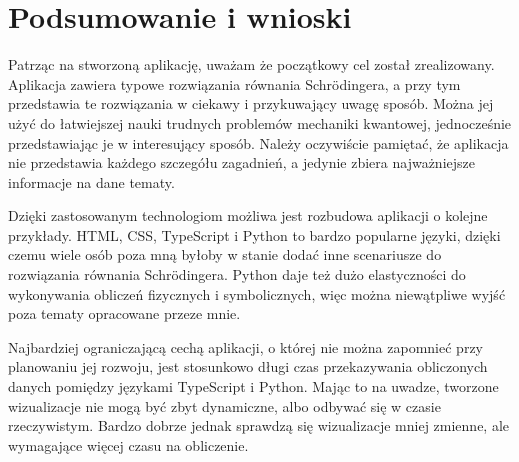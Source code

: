 \documentclass{SGGW-thesis}
\begin{document}
\chapter{Podsumowanie i wnioski}
	Patrząc na stworzoną aplikację, uważam że początkowy cel został zrealizowany. Aplikacja zawiera typowe rozwiązania równania Schrödingera, a przy tym przedstawia te rozwiązania w ciekawy i przykuwający uwagę sposób. Można jej użyć do łatwiejszej nauki trudnych problemów mechaniki kwantowej, jednocześnie przedstawiając je w interesujący sposób. Należy oczywiście pamiętać, że aplikacja nie przedstawia każdego szczegółu zagadnień, a jedynie zbiera najważniejsze informacje na dane tematy.
	
	Dzięki zastosowanym technologiom możliwa jest rozbudowa aplikacji o kolejne przykłady. HTML, CSS, TypeScript i Python to bardzo popularne języki, dzięki czemu wiele osób poza mną byłoby w stanie dodać inne scenariusze do rozwiązania równania Schrödingera. Python daje też dużo elastyczności do wykonywania obliczeń fizycznych i symbolicznych, więc można niewątpliwe wyjść poza tematy opracowane przeze mnie.
	
	Najbardziej ograniczającą cechą aplikacji, o której nie można zapomnieć przy planowaniu jej rozwoju, jest stosunkowo długi czas przekazywania obliczonych danych pomiędzy językami TypeScript i Python. Mając to na uwadze, tworzone wizualizacje nie mogą być zbyt dynamiczne, albo odbywać się w czasie rzeczywistym. Bardzo dobrze jednak sprawdzą się wizualizacje mniej zmienne, ale wymagające więcej czasu na obliczenie.
\end{document}
